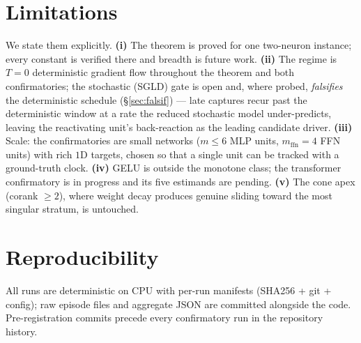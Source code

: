 \documentclass[11pt]{article}
\begin{document}
\section{Limitations}\label{sec:limits}

We state them explicitly. \textbf{(i)} The theorem is proved for one two-neuron
instance; every constant is verified there and breadth is future work.
\textbf{(ii)} The regime is $T=0$ deterministic gradient flow throughout the
theorem and both confirmatories; the stochastic (SGLD) gate is open and, where
probed, \emph{falsifies} the deterministic schedule (\S\ref{sec:falsif}) --- late
captures recur past the deterministic window at a rate the reduced stochastic
model under-predicts, leaving the reactivating unit's back-reaction as the
leading candidate driver. \textbf{(iii)} Scale: the confirmatories are small
networks ($m\le6$ MLP units, $m_{\mathrm{ffn}}=4$ FFN units) with rich $1$D
targets, chosen so that a single unit can be tracked with a ground-truth clock.
\textbf{(iv)} GELU is outside the monotone class; the transformer confirmatory is
in progress and its five estimands are pending. \textbf{(v)} The cone apex
(corank $\ge2$), where weight decay produces genuine sliding toward the most
singular stratum, is untouched.

\section{Reproducibility}\label{sec:repro}

All runs are deterministic on CPU with per-run manifests (SHA256 + git + config);
raw episode files and aggregate JSON are committed alongside the code.
Pre-registration commits precede every confirmatory run in the repository history.
\end{document}
